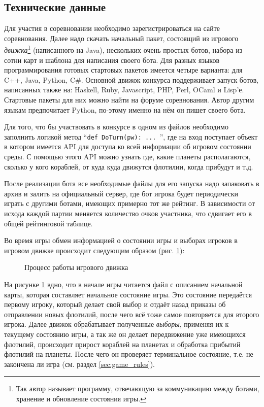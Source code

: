 \documentclass[12pt]{report}
\begin{document}
\subsection{Технические данные}
Для участия в соревновании необходимо зарегистрироваться на сайте соревнования. Далее надо скачать начальный пакет, состоящий из игрового \emph{движка}\footnote{Так автор называет программу, отвечающую за коммуникацию между ботами, хранение и обновление состояния игры.} (написанного на Java), нескольких очень простых ботов, набора из сотни карт и шаблона для написания своего бота. Для разных языков программирования готовых стартовых пакетов имеется четыре варианта: для C++, Java, Python, C\#. Основной движок конкурса поддерживает запуск ботов, написанных также на: Haskell, Ruby, Javascript, PHP, Perl, OCaml и Lisp'е. Стартовые пакеты для них можно найти на форуме соревнования. Автор другим языкам предпочитает Python, по-этому именно на нём он пишет своего бота.

Для того, что бы участвовать в конкурсе в одном из файлов необходимо заполнить логикой метод ``\texttt{def DoTurn(pw): ... }'', где на вход поступает объект в котором имеется API для доступа ко всей информации об игровом состоянии среды. С помощью этого API можно узнать где, какие планеты располагаются, сколько у кого кораблей, от куда куда движутся флотилии, когда прибудут и т.д. 

После реализации бота все необходимые файлы для его запуска надо запаковать в архив и залить на официальный сервер, где бот игрока будет периодически играть с другими ботами, имеющих примерно тот же рейтинг. В зависимости от исхода каждой партии меняется количество очков участника, что сдвигает его в общей рейтинговой таблице.

Во время игры обмен информацией о состоянии игры и выборах игроков в игровом движке происходит следующим образом (рис. \ref{fig:pw_engine_process}):

\begin{figure}[h]
	\centering
	
	\caption{Процесс работы игрового движка}
	\label{fig:pw_engine_process}
\end{figure}
На рисунке \ref{fig:pw_engine_process} вдно, что в начале игры читается файл с описанием начальной карты, которая составляет начальное состояние игры. Это состояние передаётся первому игроку, который делает свой выбор и отдаёт назад приказы об отправлении новых флотилий, после чего всё тоже самое повторяется для второго игрока. Далее движок обрабатывает полученные \emph{выборы}, применяя их к текущему состоянию игры, а так же он делает передвижение уже имеющихся флотилий, происходит прирост кораблей на планетах и обработка прибытий флотилий на планеты. После чего он проверяет терминальное состояние, т.е. не закончена ли игра (см. раздел \ref{sec:game_rules}).
\end{document}
